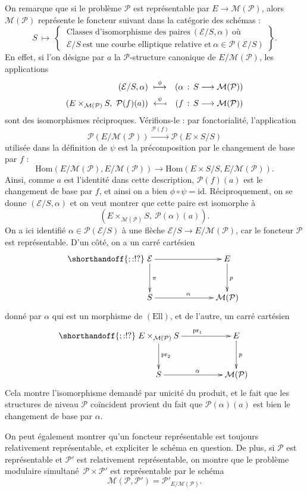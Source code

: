 \documentclass[11pt,a4paper]{article}
\newcommand{\E}{\mathcal{E}}
\renewcommand{\Pr}{\mathcal{P}}
\newcommand{\M}{\mathcal{M}}
\newcommand{\vers}{\longrightarrow}
\newcommand{\Hom}{\mathrm{Hom}}
\newcommand{\Ell}{\mathrm{Ell}}
\newcommand{\de}{\,:\,}
\newcommand{\id}{\mathrm{id}}
\newcommand{\pr}{\mathrm{pr}}
\renewcommand{\v}{\vspace{5mm}}
\theoremstyle{definition}
\begin{document}
On remarque que si le problème $\Pr$ est représentable par $E\vers \M(\Pr)$, alors $\M(\Pr)$ représente le foncteur suivant dans la catégorie des schémas :
$$S\ \longmapsto\ \left.
\begin{cases}\ \text{Classes\ d'isomorphisme\ des\ paires}\ (\E/S,\alpha)\ \text{où}\ \\
 \ \E/S\ \text{est\ une\ courbe\ elliptique\ relative\ et}\ \alpha\in \Pr(\E/S)
\end{cases} \right\}.$$
En effet, si l'on désigne par $a$ la $\Pr$-structure canonique de $E/\M(\Pr)$, les applications
$$\begin{aligned}
(\E/S, \alpha)\ &\overset{\phi}{\longmapsto}  &(\alpha\de S\vers \M(\Pr)) \\
(E \times_{\M(\Pr)} S,\ \Pr(f)(a))\ &\overset{\psi}{\mathrel{\reflectbox{\ensuremath{\longmapsto}}}} &(f\de S\vers \M(\Pr))
\end{aligned}$$
sont des isomorphismes réciproques. Vérifions-le : par fonctorialité, l'application
$$\Pr(E/\M(\Pr)) \overset{\Pr(f)} \vers \Pr(E\times S/S)$$
utilisée dans la définition de $\psi$ est la précomposition par le changement de base par $f$ :
$$\Hom(E/\M(\Pr), E/\M(\Pr)) \vers \Hom(E\times S/S, E/\M(\Pr)).$$
Ainsi, comme $a$ est l'identité dans cette description, $\Pr(f)(a)$ est le changement de base par $f$, et ainsi on a bien $\phi\circ\psi = \id.$ Réciproquement, on se donne $(\E/S, \alpha)$ et on veut montrer que cette paire est isomorphe à
$$(E \times_{\M(\Pr)} S,\ \Pr(\alpha)(a)).$$
On a ici identifié $\alpha\in \Pr(\E/S)$ à une flèche $\E/S \vers E/\M(\Pr)$, car le foncteur $\Pr$ est représentable. D'un côté, on a un carré cartésien
$$
\shorthandoff{;:!?}
\xymatrix @!=8mm {
\E \ar[d]^{\pi} \ar[rr] & & E \ar[d]^{p} \\
 S \ar[rr]^{\alpha} & & \M(\Pr)
}
$$
donné par $\alpha$ qui est un morphisme de $(\Ell)$, et de l'autre, un carré cartésien
$$
\shorthandoff{;:!?}
\xymatrix @!=8mm {
E\times_{\M(\Pr)} S \ar[d]^{\pr_2} \ar[rr]^{\pr_1} & & E \ar[d]^{p} \\
 S \ar[rr]^{\alpha} & & \M(\Pr)
}
$$
Cela montre l'isomorphisme demandé par unicité du produit, et le fait que les structures de niveau $\Pr$ coïncident provient du fait que $\Pr(\alpha)(a)$ est bien le changement de base par $\alpha$.
\v

On peut également montrer qu'un foncteur représentable est toujours relativement représentable, et expliciter le schéma en question. De plus, si $\Pr$ est représentable et $\Pr'$ est relativement représentable, on montre que le problème modulaire \og simultané\fg\ $\Pr\times\Pr'$ est représentable par le schéma 
$$\M(\Pr, \Pr') = \Pr'_{E/\M(\Pr)}.$$
\end{document}
